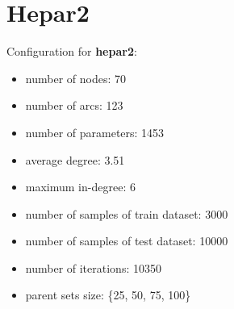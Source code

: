 \documentclass[]{scrartcl}
\begin{document}
\clearpage

\section{Hepar2}

Configuration for \textbf{hepar2}:

\begin{itemize}
\item number of nodes: 70
\item number of arcs: 123
\item number of parameters: 1453
\item average degree: 3.51
\item maximum in-degree: 6
\item number of samples of train dataset: 3000
\item number of samples of test dataset: 10000
\item number of iterations: 10350
\item parent sets size: \{25, 50, 75, 100\}
\end{itemize}
\end{document}
